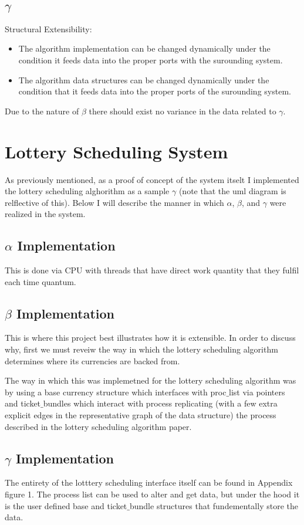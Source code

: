 \documentclass[acmsmall]{acmart}
\begin{document}
\begin{multicols}{2}
  \subsection{$\gamma$}
    Structural Extensibility:
    \begin{itemize}
      \item The algorithm implementation can be changed dynamically under the
        condition it feeds data into the proper ports with the surounding
        system.
      \item The algorithm data structures can be changed dynamically under the
        condition that it feeds data into the proper ports of the surounding
        system.
    \end{itemize}
    Due to the nature of $\beta$ there should exist no variance in the data
    related to $\gamma$.

\section{Lottery Scheduling System}
  As previously mentioned, as a proof of concept of the system itselt I
  implemented the lottery scheduling alghorithm as a sample $\gamma$ (note that
  the uml diagram is relflective of this). Below I will describe the manner in
  which $\alpha$, $\beta$, and $\gamma$ were realized in the system.
  \subsection{$\alpha$ Implementation}
    This is done via CPU with threads that have direct work quantity that they
    fulfil each time quantum.
  \subsection{$\beta$ Implementation}
    This is where this project best illustrates how it is extensible. In order
    to discuss why, first we must reveiw the way in which the lottery scheduling
    algorithm determines where its currencies are backed from.
    \par
    The way in which this was implemetned for the lottery scheduling algorithm
    was by using a base currency structure which interfaces with proc$\_$list
    via pointers and ticket$\_$bundles which interact with process replicating
    (with a few extra explicit edges in the representative graph of the data
    structure) the process described in the lottery scheduling algorithm paper.
  \subsection{$\gamma$ Implementation}
    The entirety of the lotttery scheduling interface itself can be found in
    Appendix figure 1. The process list can be used to alter and get data, but
    under the hood it is the user defined base and ticket$\_$bundle structures
    that fundementally store the data.


\end{multicols}
\end{document}
